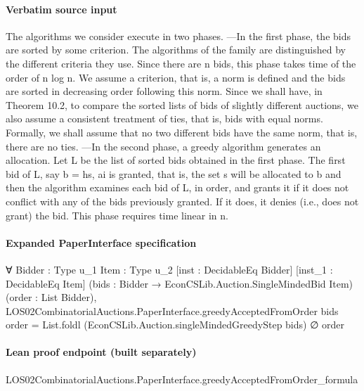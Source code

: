 \documentclass[10pt]{article}
\begin{document}
\paragraph{Verbatim source input}
\begin{ReviewVerbatim}
The algorithms we consider execute in two phases.
—In the first phase, the bids are sorted by some criterion. The algorithms of the
family are distinguished by the different criteria they use. Since there are n bids,
this phase takes time of the order of n log n. We assume a criterion, that is, a norm
is defined and the bids are sorted in decreasing order following this norm. Since
we shall have, in Theorem 10.2, to compare the sorted lists of bids of slightly
different auctions, we also assume a consistent treatment of ties, that is, bids
with equal norms. Formally, we shall assume that no two different bids have the
same norm, that is, there are no ties.
—In the second phase, a greedy algorithm generates an allocation. Let L be the
list of sorted bids obtained in the first phase. The first bid of L, say b = hs, ai is
granted, that is, the set s will be allocated to b and then the algorithm examines
each bid of L, in order, and grants it if it does not conflict with any of the bids
previously granted. If it does, it denies (i.e., does not grant) the bid. This phase
requires time linear in n.
\end{ReviewVerbatim}


\paragraph{Expanded PaperInterface specification}
\begin{ReviewVerbatim}
∀ {Bidder : Type u_1} {Item : Type u_2} [inst : DecidableEq Bidder] [inst_1 : DecidableEq Item]
  (bids : Bidder → EconCSLib.Auction.SingleMindedBid Item) (order : List Bidder),
  LOS02CombinatorialAuctions.PaperInterface.greedyAcceptedFromOrder bids order =
    List.foldl (EconCSLib.Auction.singleMindedGreedyStep bids) ∅ order
\end{ReviewVerbatim}

\paragraph{Lean proof endpoint (built separately)}\begin{ReviewVerbatim}
LOS02CombinatorialAuctions.PaperInterface.greedyAcceptedFromOrder_formula
\end{ReviewVerbatim}
\end{document}
